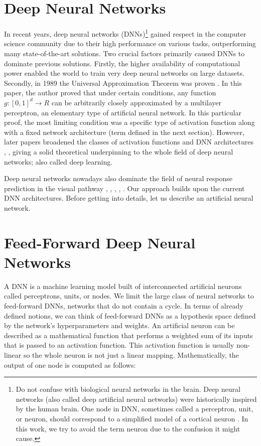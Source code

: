 \section{Deep Neural Networks}

In recent years, deep neural networks (DNNs)\footnote{Do not confuse with biological neural networks in the brain. Deep neural networks (also called deep artificial neural networks) were historically inspired by the human brain. One node in DNN, sometimes called a perceptron, unit, or neuron, should correspond to a simplified model of a cortical neuron \citep{rosenblatt1958perceptron}. In this work, we try to avoid the term neuron due to the confusion it might cause.} gained respect in the computer science community due to their high performance on various tasks, outperforming many state-of-the-art solutions. Two crucial factors primarily caused DNNs to dominate previous solutions. Firstly, the higher availability of computational power enabled the world to train very deep neural networks on large datasets. Secondly, in 1989 the Universal Approximation Theorem was proven \citep{cybenko1989approximation}. In this paper, the author proved that under certain conditions, any function $g: [0, 1]^d \to R$ can be arbitrarily closely approximated by a multilayer perceptron, an elementary type of artificial neural network. In this particular proof, the most limiting condition was a specific type of activation function along with a fixed network architecture (term defined in the next section). However, later papers broadened the classes of activation functions and DNN architectures \citep{leshno1993multilayer}, \citep{heinecke2020refinement} \citep{zhou2020universality}, giving a solid theoretical underpinning to the whole field of deep neural networks; also called deep learning.

Deep neural networks nowadays also dominate the field of neural response prediction in the visual pathway \citep{klindt2017neural}, \citep{lurz2021generalization}, \citep{ecker2018rotation}, \citep{butts2019data}, \citep{sinz2018stimulus}. Our approach builds upon the current DNN architectures. Before getting into details, let us describe an artificial neural network.

\section{Feed-Forward Deep Neural Networks}

A DNN is a machine learning model built of interconnected artificial neurons called perceptrons, units, or nodes. We limit the large class of neural networks to feed-forward DNNs, networks that do not contain a cycle. In terms of already defined notions, we can think of feed-forward DNNs as a hypothesis space defined by the network’s hyperparameters and weights. An artificial neuron can be described as a mathematical function that performs a weighted sum of its inputs that is passed to an activation function. This activation function is usually non-linear so the whole neuron is not just a linear mapping. Mathematically, the output of one node is computed as follows: 


